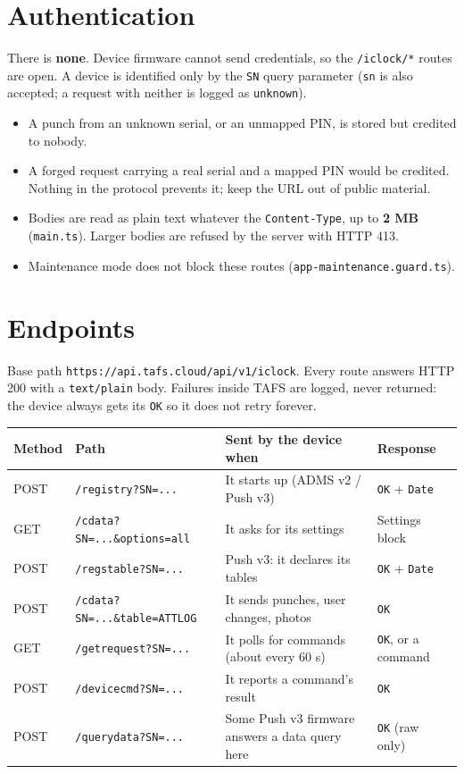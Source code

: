 \documentclass[11pt]{article}
\begin{document}
\section{Authentication}
There is \textbf{none}. Device firmware cannot send credentials, so the \texttt{/iclock/*} routes are open. A device is
identified only by the \texttt{SN} query parameter (\texttt{sn} is also accepted; a request with neither is logged as
\texttt{unknown}).
\begin{itemize}[nosep]
  \item A punch from an unknown serial, or an unmapped PIN, is stored but credited to nobody.
  \item A forged request carrying a real serial and a mapped PIN would be credited. Nothing in the protocol prevents it;
        keep the URL out of public material.
  \item Bodies are read as plain text whatever the \texttt{Content-Type}, up to \textbf{2 MB} (\texttt{main.ts}). Larger
        bodies are refused by the server with HTTP 413.
  \item Maintenance mode does not block these routes (\texttt{app-maintenance.guard.ts}).
\end{itemize}

\section{Endpoints}
Base path \texttt{https://api.tafs.cloud/api/v1/iclock}. Every route answers HTTP 200 with a \texttt{text/plain} body.
Failures inside TAFS are logged, never returned: the device always gets its \texttt{OK} so it does not retry forever.
\begin{center}
\begin{tabularx}{\textwidth}{@{}l P{0.35\textwidth} L P{0.17\textwidth}@{}}
\toprule
\textbf{Method} & \textbf{Path} & \textbf{Sent by the device when} & \textbf{Response} \\
\midrule
POST & \texttt{/registry?SN=...} & It starts up (ADMS v2 / Push v3) & \texttt{OK} + \texttt{Date} \\
GET & \texttt{/cdata?SN=...\&options=all} & It asks for its settings & Settings block \\
POST & \texttt{/regstable?SN=...} & Push v3: it declares its tables & \texttt{OK} + \texttt{Date} \\
POST & \texttt{/cdata?SN=...\&table=ATTLOG} & It sends punches, user changes, photos & \texttt{OK} \\
GET & \texttt{/getrequest?SN=...} & It polls for commands (about every 60 s) & \texttt{OK}, or a command \\
POST & \texttt{/devicecmd?SN=...} & It reports a command's result & \texttt{OK} \\
POST & \texttt{/querydata?SN=...} & Some Push v3 firmware answers a data query here & \texttt{OK} (raw only) \\
\bottomrule
\end{tabularx}
\end{center}
\end{document}
